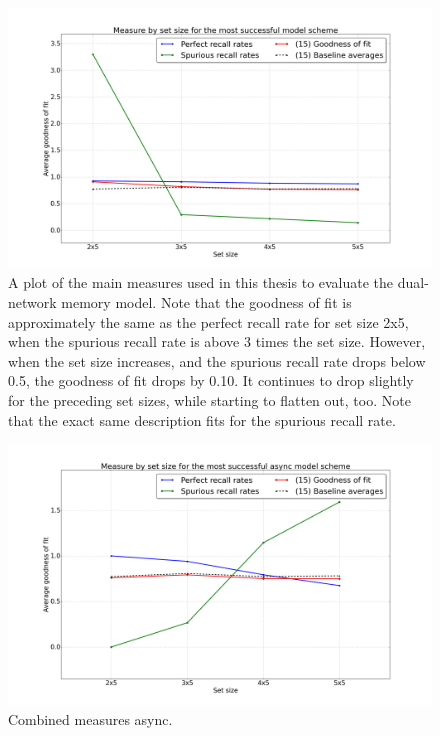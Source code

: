 \begin{figure}
    \centering
    \includegraphics[width=13cm]{fig/neo-consolidation/combined-measures-sync}
    \caption{A plot of the main measures used in this thesis to evaluate the dual-network memory model. Note that the goodness of fit is approximately the same as the perfect recall rate for set size 2x5, when the spurious recall rate is above 3 times the set size. However, when the set size increases, and the spurious recall rate drops below 0.5, the goodness of fit drops by 0.10. It continues to drop slightly for the preceding set sizes, while starting to flatten out, too. Note that the exact same description fits for the spurious recall rate.}
    \label{fig:combined-measures-sync}
\end{figure}

\begin{figure}
    \centering
    \includegraphics[width=13cm]{fig/neo-consolidation/combined-measures-async}
    \caption{Combined measures async.}
    \label{fig:combined-measures-async}
\end{figure}

